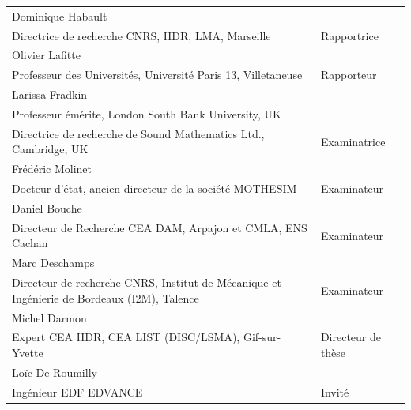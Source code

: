 \documentclass[a4paper]{article}
\newcommand{\jurynameA}{Dominique Habault}
\newcommand{\juryadressA}{Directrice de recherche CNRS, HDR, LMA, Marseille}
\newcommand{\juryroleA}{Rapportrice}
\newcommand{\jurynameB}{Olivier Lafitte}
\newcommand{\juryadressB}{Professeur des Universités, Université Paris 13, Villetaneuse}
\newcommand{\juryroleB}{Rapporteur}
\newcommand{\jurynameC}{Frédéric Molinet}
\newcommand{\juryadressC}{Docteur d'état, ancien directeur de la société MOTHESIM}
\newcommand{\juryroleC}{Examinateur}
\newcommand{\jurynameD}{Daniel Bouche}
\newcommand{\juryadressD}{Directeur de Recherche CEA DAM, Arpajon et CMLA, ENS Cachan}
\newcommand{\juryroleD}{Examinateur}
\newcommand{\jurynameE}{Larissa Fradkin}
\newcommand{\juryadressE}{Professeur émérite, London South Bank University, UK\\ Directrice de recherche de Sound Mathematics Ltd., Cambridge, UK}
\newcommand{\juryroleE}{Examinatrice}
\newcommand{\jurynameF}{Michel Darmon}
\newcommand{\juryadressF}{Expert CEA HDR, CEA LIST (DISC/LSMA), Gif-sur-Yvette}
\newcommand{\juryroleF}{Directeur de thèse}
\newcommand{\jurynameG}{Gilles Lebeau}
\newcommand{\juryadressG}{Professeur, Université de Nice Sophia-Antipolis (Laboratoire J. A. Dieudonné), Nice}
\newcommand{\juryroleG}{Co-directeur de thèse}
\newcommand{\jurynameH}{Loïc De Roumilly}
\newcommand{\juryadressH}{Ingénieur EDF EDVANCE}
\newcommand{\juryroleH}{Invité}
\newcommand{\jurynameI}{Marc Deschamps}
\newcommand{\juryadressI}{Directeur de recherche CNRS, Institut de Mécanique et Ingénierie de Bordeaux (I2M), Talence}
\newcommand{\juryroleI}{Examinateur}
\begin{document}
\begin{textblock}{10.3}
	\label{jury} 																				%
	\begin{flushleft}
	\begin{tabular}{@{} L{9.5cm} R{4.5cm}}
		\jurynameA  \\ \juryadressA & \juryroleA \\[10pt]
		\jurynameB  \\ \juryadressB & \juryroleB \\[10pt]
		\jurynameE  \\ \juryadressE & \juryroleE \\[10pt]
		\jurynameC  \\ \juryadressC & \juryroleC \\[10pt]
		\jurynameD  \\ \juryadressD & \juryroleD \\[10pt]
		\jurynameI  \\ \juryadressI & \juryroleI \\[10pt]
		\jurynameF  \\ \juryadressF & \juryroleF \\[10pt]
		\jurynameH  \\ \juryadressH & \juryroleH \\[5pt]
	\end{tabular} 
	\end{flushleft}   
\end{textblock}
\end{document}
